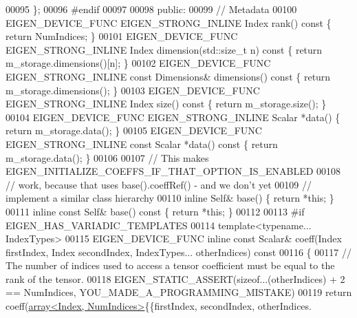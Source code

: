 \begin{DoxyCode}
00095     \};
00096 \textcolor{preprocessor}{#endif}
00097 
00098   \textcolor{keyword}{public}:
00099     \textcolor{comment}{// Metadata}
00100     EIGEN\_DEVICE\_FUNC EIGEN\_STRONG\_INLINE Index                         rank()\textcolor{keyword}{                   const }\{ \textcolor{keywordflow}{
      return} NumIndices; \}
00101     EIGEN\_DEVICE\_FUNC EIGEN\_STRONG\_INLINE Index                         dimension(std::size\_t n)\textcolor{keyword}{ const }\{ \textcolor{keywordflow}{
      return} m\_storage.dimensions()[n]; \}
00102     EIGEN\_DEVICE\_FUNC EIGEN\_STRONG\_INLINE \textcolor{keyword}{const} Dimensions&             dimensions()\textcolor{keyword}{             const }\{ \textcolor{keywordflow}{
      return} m\_storage.dimensions(); \}
00103     EIGEN\_DEVICE\_FUNC EIGEN\_STRONG\_INLINE Index                         size()\textcolor{keyword}{                   const }\{ \textcolor{keywordflow}{
      return} m\_storage.size(); \}
00104     EIGEN\_DEVICE\_FUNC EIGEN\_STRONG\_INLINE Scalar                        *data()                        \{ \textcolor{keywordflow}{
      return} m\_storage.data(); \}
00105     EIGEN\_DEVICE\_FUNC EIGEN\_STRONG\_INLINE \textcolor{keyword}{const} Scalar                  *data()\textcolor{keyword}{                  const }\{ \textcolor{keywordflow}{
      return} m\_storage.data(); \}
00106 
00107     \textcolor{comment}{// This makes EIGEN\_INITIALIZE\_COEFFS\_IF\_THAT\_OPTION\_IS\_ENABLED}
00108     \textcolor{comment}{// work, because that uses base().coeffRef() - and we don't yet}
00109     \textcolor{comment}{// implement a similar class hierarchy}
00110     \textcolor{keyword}{inline} Self& base()             \{ \textcolor{keywordflow}{return} *\textcolor{keyword}{this}; \}
00111     \textcolor{keyword}{inline} \textcolor{keyword}{const} Self& base()\textcolor{keyword}{ const }\{ \textcolor{keywordflow}{return} *\textcolor{keyword}{this}; \}
00112 
00113 \textcolor{preprocessor}{#if EIGEN\_HAS\_VARIADIC\_TEMPLATES}
00114     \textcolor{keyword}{template}<\textcolor{keyword}{typename}... IndexTypes>
00115     EIGEN\_DEVICE\_FUNC \textcolor{keyword}{inline} \textcolor{keyword}{const} Scalar& coeff(Index firstIndex, Index secondIndex, IndexTypes... 
      otherIndices)\textcolor{keyword}{ const}
00116 \textcolor{keyword}{    }\{
00117       \textcolor{comment}{// The number of indices used to access a tensor coefficient must be equal to the rank of the tensor.}
00118       EIGEN\_STATIC\_ASSERT(\textcolor{keyword}{sizeof}...(otherIndices) + 2 == NumIndices, YOU\_MADE\_A\_PROGRAMMING\_MISTAKE)
00119       \textcolor{keywordflow}{return} coeff(\hyperlink{class_eigen_1_1array}{array<Index, NumIndices>}\{\{firstIndex, secondIndex, otherIndices.

\end{DoxyCode}

